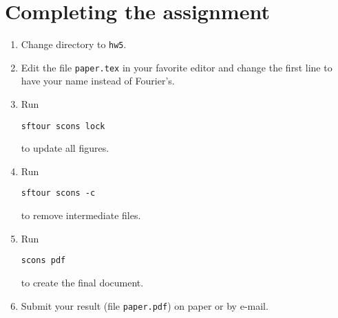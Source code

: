 
\section{Completing the assignment}

\begin{enumerate}
\item Change directory to \texttt{hw5}.
\item Edit the file \texttt{paper.tex} in your favorite editor and change the first line to have your name instead of Fourier's.
\item Run
\begin{verbatim}
sftour scons lock
\end{verbatim}
to update all figures.
\item Run
\begin{verbatim}
sftour scons -c
\end{verbatim}
to remove intermediate files.
\item Run
\begin{verbatim} 
scons pdf
\end{verbatim}
to create the final document.
\item Submit your result (file \texttt{paper.pdf}) on paper or by
  e-mail. 
\end{enumerate}


